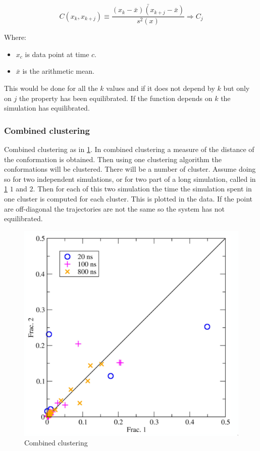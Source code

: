 		$$C(x_k, x_{k+j}) \equiv\frac{\bar{(x_k-\bar{x})(x_{k+j}-\bar{x})}}{s^2(x)}\Rightarrow C_j$$

		Where:

		\begin{multicols}{2}
			\begin{itemize}
				\item $x_c$ is data point at time $c$.
				\item $\bar{x}$ is the arithmetic mean.
			\end{itemize}
		\end{multicols}

		This would be done for all the $k$ values and if it does not depend by $k$ but only on $j$ the property has been equilibrated.
		If the function depends on $k$ the simulation has equilibrated.

		\subsubsection{Combined clustering}
		Combined clustering as in \ref{fig:independent_simulation}.
		In combined clustering a measure of the distance of the conformation is obtained.
		Then using one clustering algorithm the conformations will be clustered.
		There will be a number of cluster.
		Assume doing so for two independent simulations, or for two part of a long simulation, called in \ref{fig:independent_simulation} $1$ and $2$.
		Then for each of this two simulation the time the simulation spent in one cluster is computed for each cluster.
		This is plotted in the data.
		If the point are off-diagonal the trajectories are not the same so the system has not equilibrated.

		\begin{figure}[H]
			\centering
			\includegraphics[scale = 0.4]{independent-simulations}
			\caption{Combined clustering}
			\label{fig:independent_simulation}
		\end{figure}


